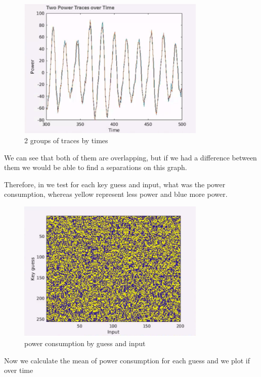 \begin{figure}[!ht]
    \centering
    \includegraphics[width=0.8\textwidth]{images/Lecture6/2traces-by-time.png}
    \caption{2 groups of traces by times} \label{fig:2traces-by-time}
\end{figure}

We can see that both of them are overlapping, but if we had a difference between them we would be able to find a separations on this graph.

Therefore, in  we test for each key guess and input, what was the power consumption, whereas yellow represent less power and blue more power.

\begin{figure}[!ht]
    \centering
    \includegraphics[width=0.8\textwidth]{images/Lecture6/intensity_by_guess.png}
    \caption{power consumption by guess and input} \label{fig:intensity_by_guess}
\end{figure}

Now we calculate the mean of power consumption for each guess and we plot if over time

